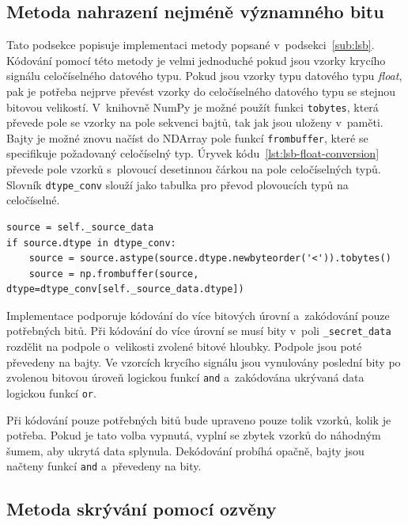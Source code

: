 \subsection*{Metoda nahrazení nejméně významného bitu}
\label{sub:lsb-implementation}

Tato podsekce popisuje implementaci metody popsané v~podsekci~\ref{sub:lsb}.
Kódování pomocí této metody je velmi jednoduché pokud jsou vzorky krycího
signálu celočíselného datového typu. Pokud jsou vzorky typu datového typu
\textit{float}, pak je potřeba nejprve převést vzorky do celočíselného datového
typu se stejnou bitovou velikostí. V~knihovně NumPy je možné použít funkci
\texttt{tobytes}, která převede pole se vzorky na pole sekvenci bajtů, tak jak
jsou uloženy v~paměti. Bajty je možné znovu načíst do NDArray pole funkcí
\texttt{frombuffer}, které se specifikuje požadovaný celočíselný typ. Úryvek
kódu~\ref{lst:lsb-float-conversion} převede pole vzorků s~plovoucí desetinnou
čárkou na pole celočíselných typů. Slovník \texttt{dtype\_conv} slouží jako
tabulka pro převod plovoucích typů na celočíselné.

\begin{lstlisting}[language=PythonPlus, label={lst:lsb-float-conversion},
caption={Převedení datového typu s~plovoucí desetinnou čárkou na celočíselný
datový typ.}]
source = self._source_data
if source.dtype in dtype_conv:
    source = source.astype(source.dtype.newbyteorder('<')).tobytes()
    source = np.frombuffer(source, dtype=dtype_conv[self._source_data.dtype])
\end{lstlisting}

Implementace podporuje kódování do více bitových úrovní a~zakódování pouze
potřebných bitů. Při kódování do více úrovní se musí bity v~poli
\texttt{\_secret\_data} rozdělit na podpole o~velikosti zvolené bitové hloubky.
Podpole jsou poté převedeny na bajty. Ve vzorcích krycího signálu jsou
vynulovány poslední bity po zvolenou bitovou úroveň logickou funkcí
\texttt{and} a~zakódována ukrývaná data logickou funkcí \texttt{or}.

Při kódování pouze potřebných bitů bude upraveno pouze tolik vzorků, kolik je
potřeba. Pokud je tato volba vypnutá, vyplní se zbytek vzorků do náhodným
šumem, aby ukrytá data splynula. Dekódování probíhá opačně, bajty jsou načteny
funkcí \texttt{and} a~převedeny na bity.

\subsection*{Metoda skrývání pomocí ozvěny}
\label{sub:echo-hiding-implementation}

